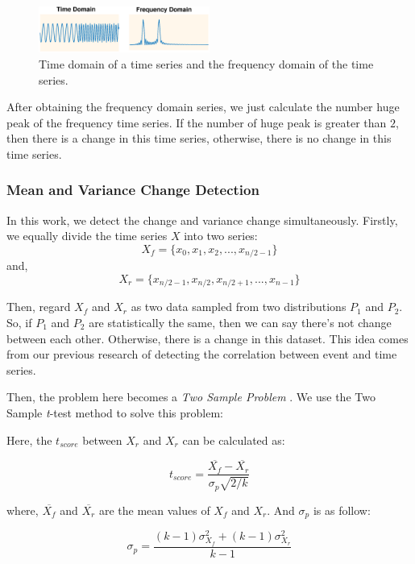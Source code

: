 \begin{figure}
\centering
\includegraphics[width=0.5\textwidth]{FFT.eps}
\caption{Time domain of a time series and the frequency domain of the time series.}
\label{fig:FFT}
\end{figure}

After obtaining the frequency domain series, we just calculate the number huge peak of the frequency time series. If the number of huge peak is greater than $2$, then there is a change in this time series, otherwise, there is no change in this time series.

\subsubsection{Mean and Variance Change Detection}

In this work, we detect the change and variance change simultaneously.
Firstly, we equally divide the time series $X$ into two series: 
\[X_{f} = \{x_0,x_1,x_2,...,x_{n/2-1}\}\]
and, 
\[X_{r} = \{x_{n/2-1},x_{n/2},x_{n/2+1},...,x_{n-1}\}\]

Then, regard $X_{f}$ and $X_{r}$ as two data sampled from two distributions $P_1$ and $P_2$. So, if $P_1$ and $P_2$ are statistically the same, then we can say there's not change between each other. Otherwise, there is a change in this dataset. This idea comes from our previous research of detecting the correlation between event and time series.

Then, the problem here becomes a \textit{Two Sample Problem} \cite{gretton2006kernel}. We use the Two Sample \textit{t}-test \cite{moore2007basic} method to solve this problem:

Here, the $t_{score}$ between $X_{r}$ and $X_{r}$ can be calculated as:

\begin{equation}
t_{score} = \frac{\overline{X_{f}} - \overline{X_{r}}}{\sigma_p\sqrt{2/k}}
\end{equation}

where, $\overline{X_{f}}$ and $\overline{X_{r}}$ are the mean values of $X_{f}$ and $X_{r}$. And $\sigma_p$ is as follow:

\begin{equation}
\sigma_p = \frac{(k-1)\sigma_{X_{f}}^2 + (k-1)\sigma_{X_{r}}^2}{k-1}
\end{equation}

